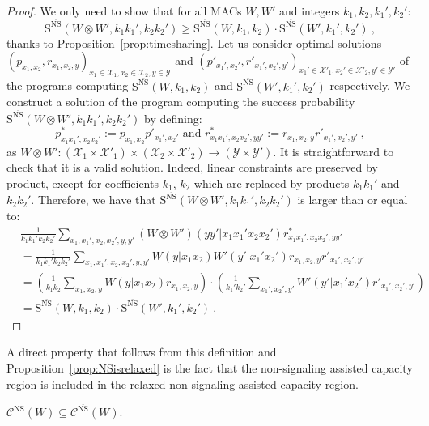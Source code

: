   \begin{proof}
  We only need to show that for all MACs $W,W'$ and integers $k_1, k_2, k_1', k_2'$:
  \[ \mathrm{S}^{\overline{\mathrm{NS}}}(W \otimes W', k_1k_1', k_2k_2') \geq \mathrm{S}^{\overline{\mathrm{NS}}}(W, k_1, k_2) \cdot \mathrm{S}^{\overline{\mathrm{NS}}}(W', k_1', k_2') \ ,\]
  thanks to Proposition~\ref{prop:timesharing}. Let us consider optimal solutions $(p_{x_1,x_2}, r_{x_1,x_2,y})_{x_1 \in \mathcal{X}_1, x_2 \in \mathcal{X}_2, y \in \mathcal{Y}}$ and $(p'_{x_1',x_2'}, r'_{x_1',x_2',y'})_{x_1' \in \mathcal{X}'_1, x_2' \in \mathcal{X}'_2, y' \in \mathcal{Y}'}$ of the programs computing $\mathrm{S}^{\overline{\mathrm{NS}}}(W, k_1, k_2)$ and $\mathrm{S}^{\overline{\mathrm{NS}}}(W', k_1', k_2')$ respectively. We construct a solution of the program computing the success probability $\mathrm{S}^{\overline{\mathrm{NS}}}(W \otimes W', k_1k_1', k_2k_2')$ by defining:
  \[ p^*_{x_1x_1',x_2x_2'} := p_{x_1,x_2}p'_{x_1',x_2'} \text{ and } r^*_{x_1x_1',x_2x_2',yy'} := r_{x_1,x_2,y}r'_{x_1',x_2',y'} \ , \]
  as $W \otimes W' : (\mathcal{X}_1 \times \mathcal{X}'_1) \times (\mathcal{X}_2  \times \mathcal{X}'_2) \rightarrow (\mathcal{Y}  \times \mathcal{Y}')$. It is straightforward to check that it is a valid solution. Indeed, linear constraints are preserved by product, except for coefficients $k_1$, $k_2$ which are replaced by products $k_1k_1'$ and $k_2k_2'$. Therefore, we have that $\mathrm{S}^{\overline{\mathrm{NS}}}(W \otimes W', k_1k_1', k_2k_2')$ is larger than or equal to:
    \begin{equation}
      \begin{aligned}
        &\frac{1}{k_1k_1'k_2k_2'} \sum_{x_1,x_1',x_2,x_2',y,y'} \left(W \otimes W'\right)(yy'|x_1x_1'x_2x_2')r^*_{x_1x_1',x_2x_2',yy'}\\
        &= \frac{1}{k_1k_1'k_2k_2'} \sum_{x_1,x_1',x_2,x_2',y,y'} W(y|x_1x_2)W'(y'|x_1'x_2')r_{x_1,x_2,y}r'_{x_1',x_2',y'}\\
        &= \left(\frac{1}{k_1k_2} \sum_{x_1,x_2,y} W(y|x_1x_2)r_{x_1,x_2,y}\right)\cdot\left(\frac{1}{k_1'k_2'} \sum_{x_1',x_2',y'} W'(y'|x_1'x_2')r'_{x_1',x_2',y'}\right)\\
        &= \mathrm{S}^{\overline{\mathrm{NS}}}(W, k_1, k_2) \cdot \mathrm{S}^{\overline{\mathrm{NS}}}(W', k_1', k_2') \ .
      \end{aligned}
    \end{equation}   
  \end{proof}

  A direct property that follows from this definition and Proposition~\ref{prop:NSisrelaxed} is the fact that the non-signaling assisted capacity region is included in the relaxed non-signaling assisted capacity region.
  \begin{corollary}
    \label{cor:NSisrelaxed}
      $\mathcal{C}^{\mathrm{NS}}(W) \subseteq \mathcal{C}^{\overline{\mathrm{NS}}}(W)$.
  \end{corollary}

